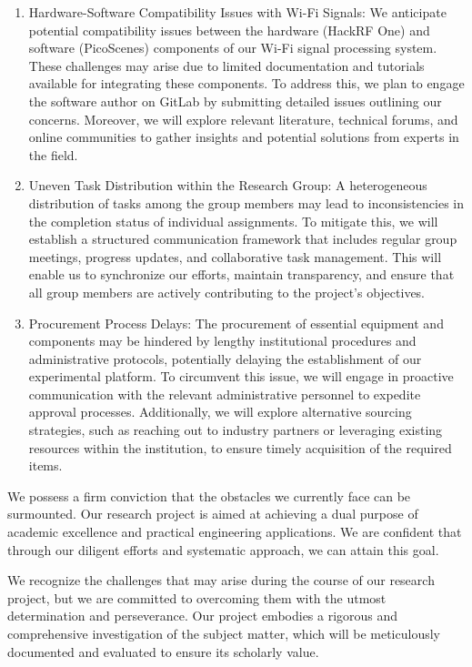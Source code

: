 \documentclass[12pt, a4paper]{article}
\begin{document}
\begin{enumerate}
\item Hardware-Software Compatibility Issues with Wi-Fi Signals: We anticipate potential compatibility issues between the hardware (HackRF One\cite{ossmann2018hackrf}) and software (PicoScenes\cite{jiang2022picoscenes}) components of our Wi-Fi signal processing system. These challenges may arise due to limited documentation and tutorials available for integrating these components. To address this, we plan to engage the software author on GitLab by submitting detailed issues outlining our concerns. Moreover, we will explore relevant literature, technical forums, and online communities to gather insights and potential solutions from experts in the field.

\item Uneven Task Distribution within the Research Group: A heterogeneous distribution of tasks among the group members may lead to inconsistencies in the completion status of individual assignments. To mitigate this, we will establish a structured communication framework that includes regular group meetings, progress updates, and collaborative task management. This will enable us to synchronize our efforts, maintain transparency, and ensure that all group members are actively contributing to the project's objectives.

\item Procurement Process Delays: The procurement of essential equipment and components may be hindered by lengthy institutional procedures and administrative protocols, potentially delaying the establishment of our experimental platform. To circumvent this issue, we will engage in proactive communication with the relevant administrative personnel to expedite approval processes. Additionally, we will explore alternative sourcing strategies, such as reaching out to industry partners or leveraging existing resources within the institution, to ensure timely acquisition of the required items.
\end{enumerate}

We possess a firm conviction that the obstacles we currently face can be surmounted. Our research project is aimed at achieving a dual purpose of academic excellence and practical engineering applications. We are confident that through our diligent efforts and systematic approach, we can attain this goal.

We recognize the challenges that may arise during the course of our research project, but we are committed to overcoming them with the utmost determination and perseverance. Our project embodies a rigorous and comprehensive investigation of the subject matter, which will be meticulously documented and evaluated to ensure its scholarly value.
\end{document}

